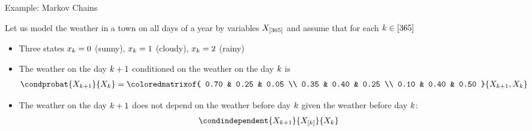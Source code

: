 \documentclass{beamer}
\begin{document}
    \begin{frame}{Example: Markov Chains}

        Let us model the weather in a town on all days of a year by variables $X_{[365]}$ and assume that for each $k\in[365]$
        \begin{itemize}
            \item Three states $x_{k}=0$ (sunny), $x_{k}=1$ (cloudy), $x_{k}=2$ (rainy)
            \item The weather on the day $k+1$ conditioned on the weather on the day $k$ is
            \begin{align*}
                \condprobat{\catvariableof{\catenumerator+1}}{\catvariableof{\catenumerator}}
                = \coloredmatrixof{    0.70 & 0.25 & 0.05 \\
                0.35 & 0.40 & 0.25 \\
                0.10 & 0.40 & 0.50 }{\catvariableof{\catenumerator+1},\catvariableof{\catenumerator}}
            \end{align*}
            \item The weather on the day $k+1$ does not depend on the weather before day $k$ given the weather before day $k$:
            \begin{align*}
                \condindependent{\catvariableof{\catenumerator+1}}{\catvariableof{[\catenumerator]}}{\catvariableof{\catenumerator}}
            \end{align*}
        \end{itemize}
    \end{frame}
\end{document}
